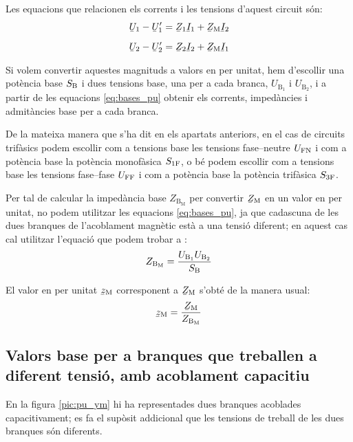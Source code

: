 Les equacions que relacionen els corrents i les tensions d'aquest circuit són:
\begin{subequations}
\begin{align}
    \cmplx{U}_1 - \cmplx{U}'_1 &= \cmplx{Z}_1 \cmplx{I}_1 + \cmplx{Z}\ped{M} \cmplx{I}_2   \\[2mm]
    \cmplx{U}_2 - \cmplx{U}'_2 &= \cmplx{Z}_2 \cmplx{I}_2 + \cmplx{Z}\ped{M} \cmplx{I}_1
\end{align}
\end{subequations}

Si volem convertir aquestes magnituds a valors en per unitat, hem d'escollir  una potència base $S_\mathrm{B}$ i dues tensions base, una  per a cada branca, $U_{\text{B}_1}$ i  $U_{\text{B}_2}$, i a partir de les equacions \eqref{eq:bases_pu} obtenir els corrents, impedàncies i admitàncies base per a cada branca.

De la mateixa manera que s'ha dit en els apartats anteriors, en el cas de circuits trifàsics podem escollir com a tensions base les tensions fase--neutre $U_\mathrm{FN}$ i com a potència base la potència  monofàsica $S_\mathrm{1F}$, o bé podem escollir com a tensions base les tensions fase--fase $U_\mathrm{FF}$ i com a potència base la potència trifàsica $S_\mathrm{3F}$.


Per tal de calcular la impedància base $Z_{\text{B}_\text{M}}$ per convertir $\cmplx{Z}\ped{M}$ en un valor en per unitat, no podem utilitzar les equacions \eqref{eq:bases_pu}, ja que cadascuna de les dues branques de l'acoblament magnètic està a una tensió diferent; en aquest cas cal utilitzar l'equació que podem trobar a \cite{TLE}:
\begin{equation}
    Z_{\text{B}_\text{M}} = \frac{U_{\text{B}_1} U_{\text{B}_2}} {S_\mathrm{B}}
\end{equation}

El valor en per unitat $\cmplx{z}\ped{M}$ corresponent a $\cmplx{Z}\ped{M}$ s'obté de la manera usual:
\begin{equation}
    \cmplx{z}\ped{M} = \frac{\cmplx{Z}\ped{M}}{Z_{\text{B}_\text{M}}}
\end{equation}


\subsection{Valors base per a branques que treballen a diferent tensió, amb acoblament capacitiu}

En la figura \vref{pic:pu_ym} hi ha representades dues branques acoblades capacitivament; es fa el supòsit addicional que les tensions de treball de les dues branques són diferents.

